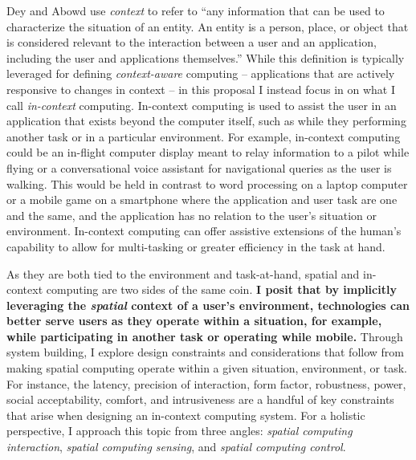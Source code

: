 \documentclass [11pt, proquest] {uwthesis}[2020/02/24]
\begin{document}
Dey and Abowd use \textit{context} to refer to “any information that can be used to characterize the situation of an entity. An entity is a person, place, or object that is considered relevant to the interaction between a user and an application, including the user and applications themselves.” While this definition is typically leveraged for defining \textit{context-aware} computing -- applications that are actively responsive to changes in context -- in this proposal I instead focus in on what I call \textit{in-context} computing. In-context computing is used to assist the user in an application that exists beyond the computer itself, such as while they performing another task or in a particular environment. For example, in-context computing could be an in-flight computer display meant to relay information to a pilot while flying or a conversational voice assistant for navigational queries as the user is walking. This would be held in contrast to word processing on a laptop computer or a mobile game on a smartphone where the application and user task are one and the same, and the application has no relation to the user’s situation or environment. In-context computing can offer assistive extensions of the human’s capability to allow for multi-tasking or greater efficiency in the task at hand. 
 
 
 
As they are both tied to the environment and task-at-hand, spatial and in-context computing are two sides of the same coin. \textbf{I posit that by implicitly leveraging the \textit{spatial} context of a user’s environment, technologies can better serve users as they operate within a situation, for example, while participating in another task or operating while mobile.} Through system building, I explore design constraints and considerations that follow from making spatial computing operate within a given situation, environment, or task. For instance, the latency, precision of interaction, form factor, robustness, power, social acceptability, comfort, and intrusiveness are a handful of key constraints that arise when designing an in-context computing system. For a holistic perspective, I approach this topic from three angles: \textit{spatial computing interaction}, \textit{spatial computing sensing}, and \textit{spatial computing control}.
\end{document}
